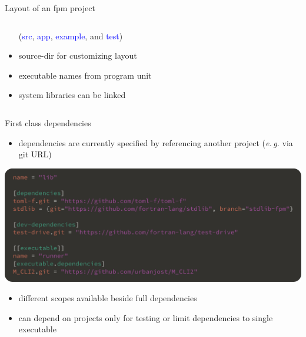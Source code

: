 \documentclass[lualatex,10pt,aspectratio=169]{beamer}
\begin{document}
\begin{frame}{Layout of an fpm project}
\begin{columns}
\begin{column}{.45\textwidth}
\begin{itemize}
               (\textcolor{blue}{src}, \textcolor{blue}{app}, \textcolor{blue}{example}, and \textcolor{blue}{test})
            \item \alert{source-dir} for customizing layout
               \\[2ex]
            \item executable names from \alert{program} unit
               \\[2ex]
            \item system libraries can be linked
               \\[2ex]
         \end{itemize}
      \end{column}
   \end{columns}
\end{frame}

\begin{frame}{First class dependencies}
   \begin{itemize}
      \item dependencies are currently specified by referencing another project
         (\textit{e.\,g.} via git URL)
   \end{itemize}

   \begin{center}
      \includegraphics[width=.85\textwidth]{Figures/dependencies.pdf}
   \end{center}

   \begin{itemize}
      \item different scopes available beside full dependencies
      \item can depend on projects only for testing or limit dependencies to single executable
   \end{itemize}
\end{frame}
\end{document}
